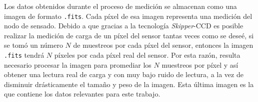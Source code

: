 \indent Los datos obtenidos durante el proceso de medición se almacenan como una imagen de formato \verb|.fits|. Cada píxel de esa imagen representa una medición del nodo de sensado. Debido a que gracias a la tecnología \textit{Skipper}-CCD es posible realizar la medición de carga de un píxel del sensor tantas veces como se deseé, si se tomó un número $N$ de muestreos por cada píxel del sensor, entonces la imagen \verb|.fits| tendrá $N$ píxeles por cada píxel real del sensor. Por esta razón, resulta necesario procesar la imagen para promediar los $N$ muestreos por píxel y así obtener una lectura real de carga y con muy bajo ruido de lectura, a la vez de disminuir drásticamente el tamaño y peso de la imagen. Esta última imagen es la que contiene los datos relevantes para este trabajo.